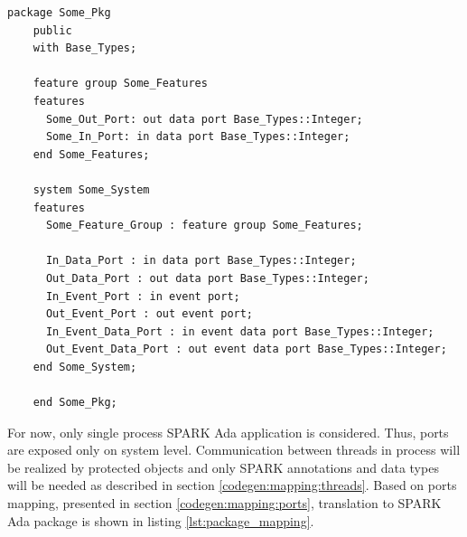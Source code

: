 \singlespacing
\begin{lstlisting}[language=aadl, frame=single, gobble=0, caption={Sample AADL package with system}]
	package Some_Pkg
	public
	with Base_Types;

	feature group Some_Features
	features
	  Some_Out_Port: out data port Base_Types::Integer;
	  Some_In_Port: in data port Base_Types::Integer;
	end Some_Features;

	system Some_System
	features
	  Some_Feature_Group : feature group Some_Features;
	  
	  In_Data_Port : in data port Base_Types::Integer;
	  Out_Data_Port : out data port Base_Types::Integer;
	  In_Event_Port : in event port;
	  Out_Event_Port : out event port;
	  In_Event_Data_Port : in event data port Base_Types::Integer;
	  Out_Event_Data_Port : out event data port Base_Types::Integer;
	end Some_System;

	end Some_Pkg;
\end{lstlisting}
\label{lst:aadl_sample}
\doublespacing

For now, only single process SPARK Ada application is considered. Thus, ports are exposed only on system level. Communication between threads in process will be realized by protected objects and only SPARK annotations and data types will be needed as described in section \ref{codegen:mapping:threads}. Based on ports mapping, presented in section \ref{codegen:mapping:ports}, translation to SPARK Ada package is shown in listing \ref{lst:package_mapping}. 

